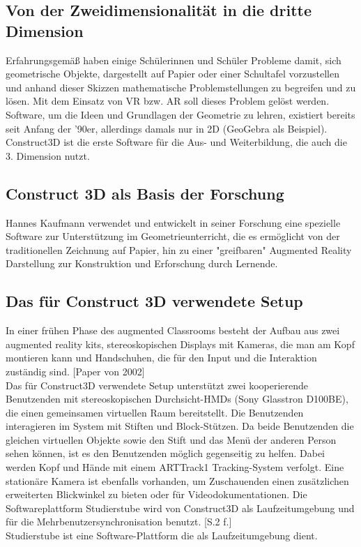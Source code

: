 \documentclass[deutsch]{llncs}
\begin{document}
\subsection{Von der Zweidimensionalität in die dritte Dimension}
\label{subsec:}
Erfahrungsgemäß haben einige Schülerinnen und Schüler Probleme damit, sich geometrische Objekte, dargestellt auf Papier oder einer Schultafel vorzustellen und anhand dieser Skizzen mathematische Problemstellungen zu begreifen und zu lösen. Mit dem Einsatz von VR bzw. AR soll dieses Problem gelöst werden.\\
Software, um die Ideen und Grundlagen der Geometrie zu lehren, existiert bereits seit Anfang der '90er, allerdings damals nur in 2D (GeoGebra als Beispiel). \\
Construct3D ist die erste Software für die Aus- und Weiterbildung, die auch die 3. Dimension nutzt. \cite{4}


\subsection{Construct 3D als Basis der Forschung}
\label{subsec:}
Hannes Kaufmann verwendet und entwickelt in seiner Forschung eine spezielle Software zur Unterstützung im Geometrieunterricht, die es ermöglicht von der traditionellen Zeichnung auf Papier,
hin zu einer "greifbaren" Augmented Reality Darstellung zur Konstruktion und Erforschung durch Lernende. 

\subsection{Das für Construct 3D verwendete Setup}
\label{subsec:}
In einer frühen Phase des augmented Classrooms besteht der Aufbau aus zwei augmented reality kits, stereoskopischen Displays mit Kameras, die man am Kopf montieren kann und Handschuhen, die für den Input und die Interaktion zuständig sind. [Paper von 2002]
\noindent \\
Das für Construct3D verwendete Setup unterstützt zwei kooperierende Benutzenden mit stereoskopischen Durchsicht-HMDs 
(Sony Glasstron D100BE), die einen gemeinsamen virtuellen Raum bereitstellt. Die Benutzenden interagieren im System mit Stiften und Block-Stützen. 
Da beide Benutzenden die gleichen virtuellen Objekte sowie den Stift und das Menü der anderen Person sehen können, ist es den Benutzenden möglich 
gegenseitig zu helfen. Dabei werden Kopf und Hände mit einem ARTTrack1 Tracking-System verfolgt. Eine stationäre Kamera ist ebenfalls vorhanden, um Zuschauenden
einen zusätzlichen erweiterten Blickwinkel zu bieten oder für Videodokumentationen. Die Softwareplattform Studierstube wird von Construct3D als 
Laufzeitumgebung und für die Mehrbenutzersynchronisation benutzt. [S.2 f.]\\
Studierstube ist eine Software-Plattform die als Laufzeitumgebung dient. 
\end{document}
